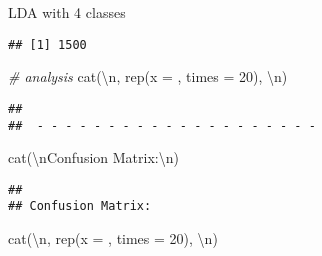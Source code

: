 \documentclass[
]{article}
\newenvironment{Shaded}{\begin{snugshade}}{\end{snugshade}}
\newcommand{\AttributeTok}[1]{\textcolor[rgb]{0.77,0.63,0.00}{#1}}
\newcommand{\CommentTok}[1]{\textcolor[rgb]{0.56,0.35,0.01}{\textit{#1}}}
\newcommand{\DecValTok}[1]{\textcolor[rgb]{0.00,0.00,0.81}{#1}}
\newcommand{\FunctionTok}[1]{\textcolor[rgb]{0.00,0.00,0.00}{#1}}
\newcommand{\NormalTok}[1]{#1}
\newcommand{\OtherTok}[1]{\textcolor[rgb]{0.56,0.35,0.01}{#1}}
\newcommand{\SpecialCharTok}[1]{\textcolor[rgb]{0.00,0.00,0.00}{#1}}
\newcommand{\StringTok}[1]{\textcolor[rgb]{0.31,0.60,0.02}{#1}}
\begin{document}
LDA with 4 classes

\begin{Shaded}
\end{Shaded}

\begin{verbatim}
## [1] 1500
\end{verbatim}

\begin{Shaded}
\begin{Highlighting}[]
\CommentTok{\# analysis}
\FunctionTok{cat}\NormalTok{(}\StringTok{\textquotesingle{}}\SpecialCharTok{\textbackslash{}n}\StringTok{\textquotesingle{}}\NormalTok{, }\FunctionTok{rep}\NormalTok{(}\AttributeTok{x =} \StringTok{\textquotesingle{}{-}\textquotesingle{}}\NormalTok{, }\AttributeTok{times =} \DecValTok{20}\NormalTok{), }\StringTok{\textquotesingle{}}\SpecialCharTok{\textbackslash{}n}\StringTok{\textquotesingle{}}\NormalTok{)}
\end{Highlighting}
\end{Shaded}

\begin{verbatim}
## 
##  - - - - - - - - - - - - - - - - - - - -
\end{verbatim}

\begin{Shaded}
\begin{Highlighting}[]
\FunctionTok{cat}\NormalTok{(}\StringTok{\textquotesingle{}}\SpecialCharTok{\textbackslash{}n}\StringTok{Confusion Matrix:}\SpecialCharTok{\textbackslash{}n}\StringTok{\textquotesingle{}}\NormalTok{)}
\end{Highlighting}
\end{Shaded}

\begin{verbatim}
## 
## Confusion Matrix:
\end{verbatim}

\begin{Shaded}
\begin{Highlighting}[]
\FunctionTok{cat}\NormalTok{(}\StringTok{\textquotesingle{}}\SpecialCharTok{\textbackslash{}n}\StringTok{\textquotesingle{}}\NormalTok{, }\FunctionTok{rep}\NormalTok{(}\AttributeTok{x =} \StringTok{\textquotesingle{}{-}\textquotesingle{}}\NormalTok{, }\AttributeTok{times =} \DecValTok{20}\NormalTok{), }\StringTok{\textquotesingle{}}\SpecialCharTok{\textbackslash{}n}\StringTok{\textquotesingle{}}\NormalTok{)}
\end{Highlighting}
\end{Shaded}
\end{document}
